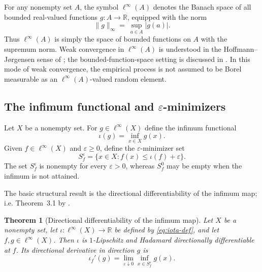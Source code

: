 \documentclass[11pt]{article}
\newtheorem{theorem}{Theorem}[section]
\begin{document}
For any nonempty set $A$, the symbol $\ell^{\infty}(A)$ denotes
the Banach space of all bounded real-valued functions $g:A\to\mathbb{R}$,
equipped with the norm 
\[
\lVert g\rVert_{\infty}=~\sup_{a\in A}\lvert g(a)\rvert.
\]
Thus $\ell^{\infty}(A)$ is simply the space of bounded functions
on $A$ with the supremum norm. Weak convergence in $\ell^{\infty}(A)$
is understood in the Hoffmann--Jørgensen sense of
\citet[Definition~1.3.3]{vdVW2023}; the bounded-function-space
setting is discussed in \citet[Section~1.5]{vdVW2023}. In this mode of
weak convergence, the empirical process is not assumed to be Borel
measurable as an $\ell^{\infty}(A)$-valued random element.

\subsection{\texorpdfstring{The infimum functional and $\varepsilon$-minimizers}{The
infimum functional and epsilon-minimizers}}

Let $X$ be a nonempty set. For $g\in\ell^{\infty}(X)$ define the
infimum functional 
\begin{equation}
\iota(g)=\inf_{x\in X}g(x).\label{eq:iota-def}
\end{equation}
Given $f\in\ell^{\infty}(X)$ and $\varepsilon\ge0$, define the $\varepsilon$-minimizer
set 
\begin{equation}
S_{f}^{\varepsilon}=\{x\in X:f(x)\le\iota(f)+\varepsilon\}.\label{eq:Sfeps}
\end{equation}
The set $S_{f}^{\varepsilon}$ is nonempty for every $\varepsilon>0$,
whereas $S_{f}^{0}$ may be empty when the infimum is not attained.

The basic structural result is the directional differentiability of
the infimum map; i.e. Theorem~3.1
by \citet{Westerhout2024}.

\begin{theorem}[Directional differentiability of the infimum map]\label{thm:infdir}
Let $X$ be a nonempty set, let $\iota:\ell^{\infty}(X)\to\mathbb{R}$
be defined by \eqref{eq:iota-def}, and let $f,g\in\ell^{\infty}(X)$.
Then $\iota$ is $1$-Lipschitz and Hadamard directionally differentiable
at $f$. Its directional derivative in direction $g$ is 
\begin{equation}
\iota_{f}'(g)=\lim_{\varepsilon\downarrow0}\inf_{x\in S_{f}^{\varepsilon}}g(x).\label{eq:dir-derivative}
\end{equation}
\end{theorem}
\end{document}
